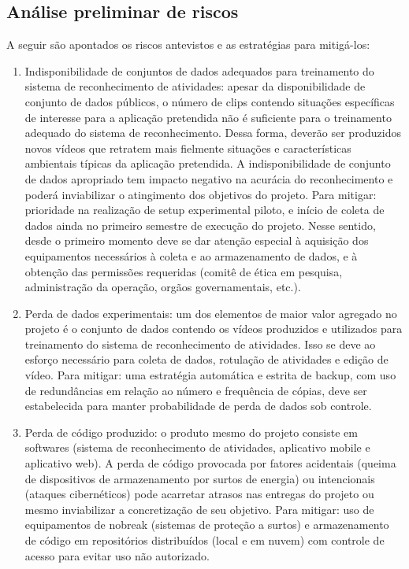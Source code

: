 \subsection{Análise preliminar de riscos}
\label{ssec:risco}
A seguir são apontados os riscos antevistos e as estratégias para mitigá-los: 
\begin{enumerate}
	\item Indisponibilidade de conjuntos de dados adequados para treinamento do sistema de reconhecimento de atividades: apesar da disponibilidade de conjunto de dados públicos, o número de clips contendo situações específicas de interesse para a aplicação pretendida não é suficiente para o treinamento adequado do sistema de reconhecimento. Dessa forma, deverão ser produzidos novos vídeos que retratem mais fielmente situações e características ambientais típicas da aplicação pretendida. A indisponibilidade de conjunto de dados apropriado tem impacto negativo na acurácia do reconhecimento e poderá inviabilizar o atingimento dos objetivos do projeto. Para mitigar: prioridade na realização de setup experimental piloto, e início de coleta de dados ainda no primeiro semestre de execução do projeto. Nesse sentido, desde o primeiro momento deve se dar atenção especial à aquisição dos equipamentos necessários à coleta e ao armazenamento de dados, e à obtenção das permissões requeridas (comitê de ética em pesquisa, administração da operação, orgãos governamentais, etc.).
	\item Perda de dados experimentais: um dos elementos de maior valor agregado no projeto é o conjunto de dados contendo os vídeos produzidos e utilizados para treinamento do sistema de reconhecimento de atividades. Isso se deve ao esforço necessário para coleta de dados, rotulação de atividades e edição de vídeo. Para mitigar: uma estratégia automática e estrita de backup, com uso de redundâncias em relação ao número e frequência de cópias, deve ser estabelecida para manter probabilidade de perda de dados sob controle.
	\item Perda de código produzido: o produto mesmo do projeto consiste em softwares (sistema de reconhecimento de atividades, aplicativo mobile e aplicativo web). A perda de código provocada por fatores acidentais (queima de dispositivos de armazenamento por surtos de energia) ou intencionais (ataques cibernéticos) pode acarretar atrasos nas entregas do projeto ou mesmo inviabilizar a concretização de seu objetivo. Para mitigar: uso de equipamentos de nobreak (sistemas de proteção a surtos) e armazenamento de código em repositórios distribuídos (local e em nuvem) com controle de acesso para evitar uso não autorizado.

\end{enumerate}
